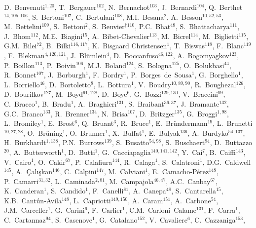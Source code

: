 D.~Benvenuti$^{{1, 20}}$,
T.~Bergauer$^{{102}}$,
N.~Bernachot$^{{103}}$,
J.~Bernardi$^{{104}}$,
Q.~Berthet$^{{14, 105, 106}}$,
S.~Bertoni$^{{107}}$,
C.~Bertulani$^{{108}}$,
M.I.~Besana$^{{2}}$,
A.~Besson$^{{10, 52, 53}}$,
M.~Bettelini$^{{109}}$,
S.~Bettoni$^{{2}}$,
S.~Beuvier${}^\dag$$^{{110}}$,
P.C.~Bhat$^{{48}}$,
S.~Bhattacharya$^{{111}}$,
J.~Bhom$^{{112}}$,
M.E.~Biagini$^{{15}}$,
A.~Bibet-Chevalier$^{{113}}$,
M.~Bicrel$^{{114}}$,
M.~Biglietti$^{{115}}$,
G.M.~Bilei$^{{72}}$,
B.~Bilki$^{{116, 117}}$,
K.~Bisgaard Christensen$^{{1}}$,
T.~Biswas$^{{118}}$,
F.~Blanc$^{{119}}$,
F.~Blekman$^{{4, 120, 121}}$,
J.~Bl{\"u}mlein$^{{4}}$,
D.~Boccanfuso$^{{46, 122}}$,
A.~Bogomyagkov$^{{123}}$,
P.~Boillon$^{{113}}$,
P.~Boivin$^{{106}}$,
M.J.~Boland$^{{124}}$,
S.~Bologna$^{{125}}$,
O.~Bolukbasi$^{{44}}$,
R.~Bonnet$^{{107}}$,
J.~Borburgh$^{{1}}$,
F.~Bordry$^{{1}}$,
P.~Borges~de~Sousa$^{{1}}$,
G.~Borghello$^{{1}}$,
L.~Borriello$^{{46}}$,
D.~Bortoletto$^{{8}}$,
L.~Bottura$^{{1}}$,
V.~Boudry$^{{10, 89, 90}}$,
R.~Boughezal$^{{126}}$,
D.~Bourilkov$^{{127}}$,
M.~Boyd$^{{91, 128}}$,
D.~Boye$^{{6}}$,
G.~Bozzi$^{{129, 130}}$,
V.~Braccini$^{{99}}$,
C.~Bracco$^{{1}}$,
B.~Bradu$^{{1}}$,
A.~Braghieri$^{{131}}$,
S.~Braibant$^{{36, 37}}$,
J.~Bramante$^{{132}}$,
G.C.~Branco$^{{133}}$,
R.~Brenner$^{{134}}$,
N.~Brisa$^{{107}}$,
D.~Britzger$^{{135}}$,
G.~Broggi$^{{1, 98}}$,
L.~Bromiley$^{{1}}$,
E.~Brost$^{{6}}$,
Q.~Bruant$^{{3}}$,
R.~Bruce$^{{1}}$,
E.~Br{\"u}ndermann$^{{19}}$,
L.~Brunetti$^{{10, 27, 28}}$,
O.~Br{\"u}ning$^{{1}}$,
O.~Brunner$^{{1}}$,
X.~Buffat$^{{1}}$,
E.~Bulyak$^{{136}}$,
A.~Burdyko$^{{54, 137}}$,
H.~Burkhardt$^{{1, 138}}$,
P.N.~Burrows$^{{139}}$,
S.~Busatto$^{{54, 98}}$,
S.~Buschaert$^{{94}}$,
D.~Buttazzo$^{{20}}$,
A.~Butterworth$^{{1}}$,
D.~Butti$^{{1}}$,
G.~Cacciapaglia$^{{140, 141, 142}}$,
Y.~Cai$^{{7}}$,
B.~Caiffi$^{{143}}$,
V.~Cairo$^{{1}}$,
O.~Cakir$^{{67}}$,
P.~Calafiura$^{{144}}$,
R.~Calaga$^{{1}}$,
S.~Calatroni$^{{1}}$,
D.G.~Caldwell$^{{145}}$,
A.~{\c C}al{\i}{\c s}kan$^{{146}}$,
C.~Calpini$^{{147}}$,
M.~Calviani$^{{1}}$,
E.~Camacho-P{\'e}rez$^{{148}}$,
P.~Camarri$^{{31, 32}}$,
L.~Caminada$^{{2, 81}}$,
M.~Campajola$^{{46, 47}}$,
A.C.~Canbay$^{{67}}$,
K.~Canderan$^{{1}}$,
S.~Candido$^{{1}}$,
F.~Canelli$^{{81}}$,
A.~Canepa$^{{48}}$,
S.~Cantarella$^{{15}}$,
K.B.~Cant{\'u}n-Avila$^{{148}}$,
L.~Capriotti$^{{149, 150}}$,
A.~Caram$^{{151}}$,
A.~Carbone$^{{54}}$,
J.M.~Carceller$^{{1}}$,
G.~Carini$^{{6}}$,
F.~Carlier$^{{1}}$,
C.M.~Carloni~Calame$^{{131}}$,
F.~Carra$^{{1}}$,
C.~Cartannaz$^{{94}}$,
S.~Casenove$^{{1}}$,
G.~Catalano$^{{152}}$,
V.~Cavaliere$^{{6}}$,
C.~Cazzaniga$^{{153}}$,
$$

